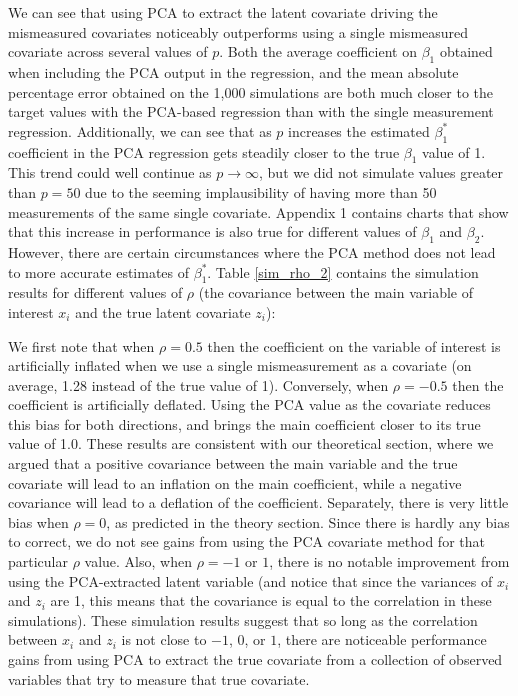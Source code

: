 \documentclass[12pt]{article}
\begin{document}
        \clearpage

        

        We can see that using PCA to extract the latent covariate driving the mismeasured covariates noticeably outperforms using a single mismeasured covariate across several values of $p$. Both the average coefficient on $\beta_1$ obtained when including the PCA output in the regression, and the mean absolute percentage error obtained on the 1,000 simulations are both much closer to the target values with the PCA-based regression than with the single measurement regression. Additionally, we can see that as $p$ increases the estimated $\beta_1^*$ coefficient in the PCA regression gets steadily closer to the true $\beta_1$ value of 1. This trend could well continue as $p \to \infty$, but we did not simulate values greater than $p = 50$ due to the seeming implausibility of having more than 50 measurements of the same single covariate. Appendix 1 contains charts that show that this increase in performance is also true for different values of $\beta_1$ and $\beta_2$.\\

        However, there are certain circumstances where the PCA method does not lead to more accurate estimates of $\beta_1^*$. Table \ref{sim_rho_2} contains the simulation results for different values of $\rho$ (the covariance between the main variable of interest $x_i$ and the true latent covariate $z_i$):

        \clearpage

        

        We first note that when $\rho = 0.5$ then the coefficient on the variable of interest is artificially inflated when we use a single mismeasurement as a covariate (on average, 1.28 instead of the true value of 1). Conversely, when $\rho = -0.5$ then the coefficient is artificially deflated. Using the PCA value as the covariate reduces this bias for both directions, and brings the main coefficient closer to its true value of 1.0. These results are consistent with our theoretical section, where we argued that a positive covariance between the main variable and the true covariate will lead to an inflation on the main coefficient, while a negative covariance will lead to a deflation of the coefficient. Separately, there is very little bias when $\rho = 0$, as predicted in the theory section. Since there is hardly any bias to correct, we do not see gains from using the PCA covariate method for that particular $\rho$ value. Also, when $\rho = -1$ or $1$, there is no notable improvement from using the PCA-extracted latent variable (and notice that since the variances of $x_i$ and $z_i$ are 1, this means that the covariance is equal to the correlation in these simulations). These simulation results suggest that so long as the correlation between $x_i$ and $z_i$ is not close to $-1$, $0$, or $1$, there are noticeable performance gains from using PCA to extract the true covariate from a collection of observed variables that try to measure that true covariate.\\
        
\end{document}
